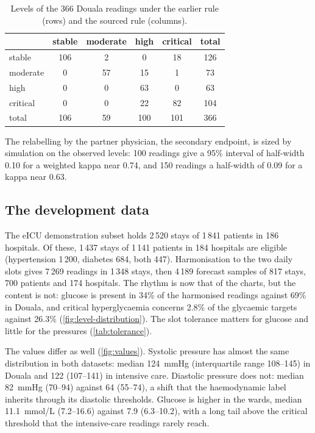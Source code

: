 \documentclass[11pt,a4paper,oneside]{report}
\begin{document}
\begin{table}[htbp]
\centering\footnotesize
\caption{Levels of the 366 Douala readings under the earlier rule (rows) and the sourced rule (columns).}\label{tab:rule-change}
\begin{tabular}{@{}lccccc@{}}
\toprule
 & \textbf{stable} & \textbf{moderate} & \textbf{high} & \textbf{critical} & \textbf{total} \\
\midrule
stable   & 106 & 2  & 0   & 18  & 126 \\
moderate & 0   & 57 & 15  & 1   & 73 \\
high     & 0   & 0  & 63  & 0   & 63 \\
critical & 0   & 0  & 22  & 82  & 104 \\
\midrule
total    & 106 & 59 & 100 & 101 & 366 \\
\bottomrule
\end{tabular}
\end{table}

The relabelling by the partner physician, the secondary endpoint, is sized by simulation on the observed levels: 100 readings give a 95\% interval of half-width 0.10 for a weighted kappa near 0.74, and 150 readings a half-width of 0.09 for a kappa near 0.63.

\subsection{The development data}

The eICU demonstration subset holds 2\,520 stays of 1\,841 patients in 186 hospitals. Of these, 1\,437 stays of 1\,141 patients in 184 hospitals are eligible (hypertension 1\,200, diabetes 684, both 447). Harmonisation to the two daily slots gives 7\,269 readings in 1\,348 stays, then 4\,189 forecast samples of 817 stays, 700 patients and 174 hospitals. The rhythm is now that of the charts, but the content is not: glucose is present in 34\% of the harmonised readings against 69\% in Douala, and critical hyperglycaemia concerns 2.8\% of the glycaemic targets against 26.3\% (\cref{fig:level-distribution}). The slot tolerance matters for glucose and little for the pressures (\cref{tab:tolerance}).

The values differ as well (\cref{fig:values}). Systolic pressure has almost the same distribution in both datasets: median 124~mmHg (interquartile range 108--145) in Douala and 122 (107--141) in intensive care. Diastolic pressure does not: median 82~mmHg (70--94) against 64 (55--74), a shift that the haemodynamic label inherits through its diastolic thresholds. Glucose is higher in the wards, median 11.1~mmol/L (7.2--16.6) against 7.9 (6.3--10.2), with a long tail above the critical threshold that the intensive-care readings rarely reach.
\end{document}
